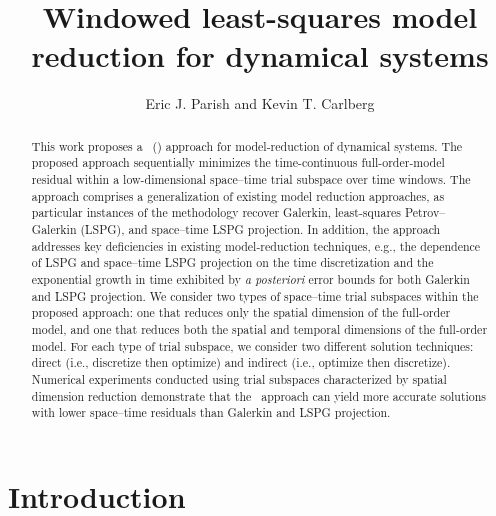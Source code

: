 \documentclass[3p,computermodern,10pt]{elsarticle}
\begin{document}
\begin{frontmatter}

\title{Windowed least-squares model reduction for dynamical systems}

\author[a]{Eric J. Parish and Kevin T. Carlberg}

\address[a]{Sandia National Laboratories,  Livermore, CA}
\begin{abstract}
This work proposes a \methodNameLower\ (\methodAcronym) approach for model-reduction
	of dynamical systems. The proposed approach sequentially minimizes the
	time-continuous full-order-model residual within a low-dimensional space--time trial
	subspace over time windows. The approach comprises a generalization 
of existing model reduction approaches, as particular instances of
  the methodology recover Galerkin,
	least-squares Petrov--Galerkin (LSPG), and space–time LSPG projection. In
	addition, the approach
	addresses key deficiencies in existing model-reduction
	techniques, e.g., the dependence of LSPG and space--time LSPG projection on the
	time discretization and the exponential growth in time exhibited by \textit{a posteriori}
	error bounds for both Galerkin and LSPG projection.  We consider two types of
	space--time trial
	subspaces within the proposed approach: one that reduces only the spatial dimension of the full-order model, and one that reduces both the spatial and temporal dimensions of the full-order model. For each type of trial
	subspace, we consider two different solution techniques: direct (i.e.,
	discretize then optimize) and indirect (i.e., optimize then discretize).
	Numerical experiments conducted using trial subspaces characterized by spatial
	dimension reduction demonstrate that the \methodAcronym\
	approach can yield more accurate solutions with lower space--time residuals than
	Galerkin and LSPG projection. 

\end{abstract}
\end{frontmatter}


\section{Introduction}
\end{document}
